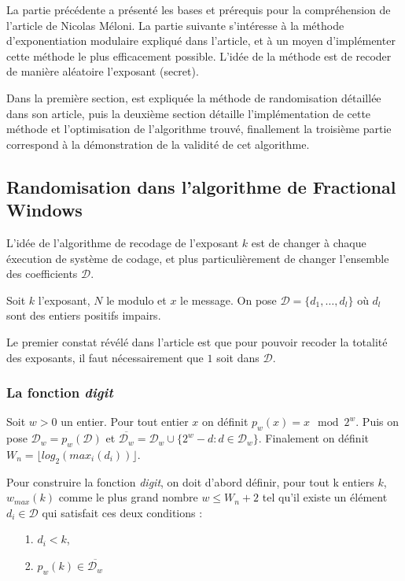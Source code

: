 \documentclass[12pt, a4paper]{memoir}
\begin{document}
La partie précédente a présenté les bases et prérequis pour la compréhension de l'article de Nicolas Méloni.
La partie suivante s'intéresse à la méthode d'exponentiation modulaire expliqué dans l'article, 
et à un moyen d'implémenter cette méthode le plus efficacement possible. 
L'idée de la méthode est de recoder de manière aléatoire l'exposant (secret).

Dans la première section, est expliquée la méthode de randomisation détaillée dans son article, puis la deuxième
section détaille l'implémentation de cette méthode et l'optimisation de l'algorithme trouvé, 
finallement la troisième partie correspond à la démonstration de la validité de cet algorithme.

\subsection{Randomisation dans l'algorithme de Fractional Windows}

L'idée de l'algorithme de recodage de l'exposant $k$ est de changer à chaque éxecution de système de codage,
et plus particulièrement de changer l'ensemble des coefficients $\mathcal{D}$.

Soit $k$ l'exposant, $N$ le modulo et $x$ le message.
On pose $\mathcal{D} = \{d_1,\ldots,d_l\}$ où $d_l$ sont des entiers positifs impairs.

Le premier constat révélé dans l'article est que pour pouvoir recoder la totalité des exposants, il faut nécessairement
que $1$ soit dans $\mathcal{D}$.

\subsubsection{La fonction \emph{digit}}

Soit $w > 0$ un entier. Pour tout entier $x$ on définit $p_w(x) = x \mod 2^w $. 
Puis on pose $\mathcal{D}_w = p_w(\mathcal{D})$ et $\overline{\mathcal{D}_w} = \mathcal{D}_w \cup \{2^w - d: d \in \mathcal{D}_w\}$.
Finalement on définit $W_n = \lfloor log_2(max_i(d_i)) \rfloor$.

Pour construire la fonction \emph{digit}, on doit d'abord définir, pour tout k entiers $k$, $w_{max}(k)$ comme le plus grand nombre $w \leq W_n+2$ tel qu'il existe un élément $d_i \in \mathcal{D}$ qui satisfait ces deux conditions :

\begin{itemize}
 \item [1.] $d_i < k$,
 \item [2.] $p_w(k) \in \overline{\mathcal{D}_w}$
\end{itemize}
\end{document}
